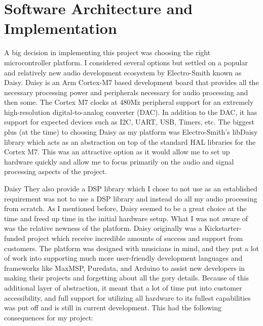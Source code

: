 \documentclass[acmlarge,screen]{acmart}
\begin{document}
\section{Software Architecture and Implementation}

A big decision in implementing this project was choosing the right microcontroller platform. I considered several options but settled on a popular and relatively new audio development ecosystem by Electro-Smith known as Daisy. Daisy is an Arm Cortex-M7 based development board that provides all the necessary processing power and peripherals necessary for audio processing and then some. The Cortex M7 clocks at 480Mz peripheral support for an extremely high-resolution digital-to-analog converter (DAC). In addition to the DAC, it has support for expected devices such as I2C, UART, USB, Timers, etc. The biggest plus (at the time) to choosing Daisy as my platform was Electro-Smith's libDaisy library which acts as an abstraction on top of the standard HAL libraries for the Cortex M7. This was an attractive option as it would allow me to set up hardware quickly and allow me to focus primarily on the audio and signal processing aspects of the project.

Daisy
They also provide a DSP library which I chose to not use as an established requirement was not to use a DSP library and instead do all my audio processing from scratch. As I mentioned before, Daisy seemed to be a great choice at the time and freed up time in the initial hardware setup. What I was not aware of was the relative newness of the platform. Daisy originally was a Kickstarter-funded project which receive incredible amounts of success and support from customers. The platform was designed with musicians in mind, and they put a lot of work into supporting much more user-friendly development languages and frameworks like MaxMSP, Puredata, and Arduino to assist new developers in making their projects and forgetting about all the gory details. Because of this additional layer of abstraction, it meant that a lot of time put into customer accessibility, and full support for utilizing all hardware to its fullest capabilities was put off and is still in current development. This had the following consequences for my project:
\end{document}
